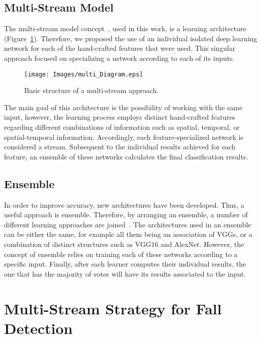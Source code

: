 \documentclass{article}
\begin{document}
\subsection{Multi-Stream Model}
\label{ssec:MModel}

The multi-stream model concept~\cite{simonyan2014,wang2015towards}, used in this work, is a learning architecture (Figure~\ref{fig:multistream}). Therefore, we proposed the use of an individual isolated deep learning network for each of the hand-crafted features that were used. This singular approach focused on specializing a network according to each of its inputs.

\begin{figure}[!htb]
\centering
\texttt{[image: Images/multi\_Diagram.eps]}
\caption{Basic structure of a multi-stream approach.}
\label{fig:multistream}
\end{figure}

The main goal of this architecture is the possibility of working with the same input, however, the learning process employs distinct hand-crafted features regarding different combinations of information such as spatial, temporal, or spatial-temporal information. Accordingly, each feature-specialized network is considered a stream. Subsequent to the individual results achieved for each feature, an ensemble of these networks calculates the final classification results.

\subsection{Ensemble}
\label{ssec:esb}

In order to improve accuracy, new architectures have been developed. Thus, a useful approach is ensemble. Therefore, by arranging an ensemble, a number of different learning approaches are joined~\cite{dietterich2000ensemble}. The architectures used in an ensemble can be either the same, for example all them being an association of VGGs, or a combination of distinct structures such as VGG16 and AlexNet. However, the concept of ensemble relies on training each of these networks according to a specific input. Finally, after each learner computes their individual results, the one that has the majority of votes will have its results associated to the input.

\section{Multi-Stream Strategy for Fall Detection}
\label{sec:model}
\end{document}
